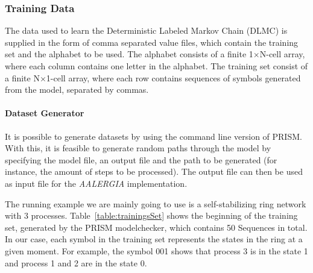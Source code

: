 \documentclass[
a4paper,
12pt
]{scrartcl}
\begin{document}
\begin{figure}[H]
\begin{center}
\end{center}
     \label{fig:diaAalergia}
\end{figure}

\subsubsection{Training Data}
The data used to learn the Deterministic Labeled Markov Chain (DLMC) is supplied in the form of comma separated value files, which contain the training set and the alphabet to be used. The alphabet consists of a finite 1$\times$N-cell array, where each column contains one letter in the alphabet. The training set consist of a finite N$\times$1-cell array, where each row contains sequences of symbols generated from the model, separated by commas.
\paragraph{Dataset Generator} It is possible to generate datasets by using the command line version of PRISM. With this, it is feasible to generate random paths through the model by specifying the model file, an output file and the path to be generated (for instance, the amount of steps to be processed). The output file can then be used as input file for the \emph{AALERGIA} implementation.
\par The running example we are mainly going to use is a self-stabilizing ring network with 3 processes.
Table~\ref{table:trainingsSet} shows the beginning of the training set, generated by the PRISM modelchecker, which contains 50 Sequences in total.  In our case, each symbol in the training set represents the states in the ring at a given moment. For example, the symbol 001 shows that process 3 is in the state 1 and process 1 and 2 are in the state 0.
\end{document}
